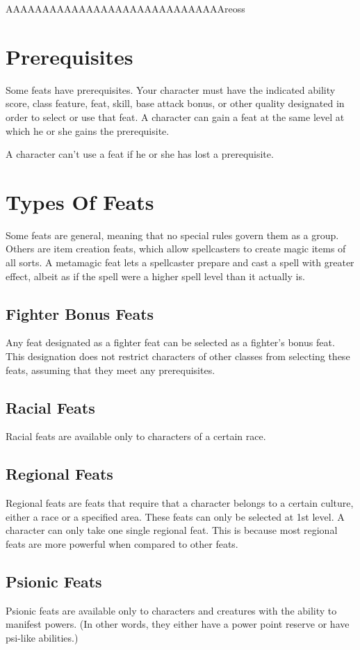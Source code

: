{AAAAAAAAAAAAAAAAAAAAAAAAAAAAAA}{reoss}
\section{Prerequisites}
Some feats have prerequisites. Your character must have the indicated ability score, class feature, feat, skill, base attack bonus, or other quality designated in order to select or use that feat. A character can gain a feat at the same level at which he or she gains the prerequisite.

A character can't use a feat if he or she has lost a prerequisite.

\section{Types Of Feats}
Some feats are general, meaning that no special rules govern them as a group. Others are item creation feats, which allow spellcasters to create magic items of all sorts. A metamagic feat lets a spellcaster prepare and cast a spell with greater effect, albeit as if the spell were a higher spell level than it actually is.

\subsection{Fighter Bonus Feats}
Any feat designated as a fighter feat can be selected as a fighter's bonus feat. This designation does not restrict characters of other classes from selecting these feats, assuming that they meet any prerequisites.

\subsection{Racial Feats}
Racial feats are available only to characters of a certain race. 

\subsection{Regional Feats}
Regional feats are feats that require that a character belongs to a certain culture, either a race or a specified area. These feats can only be selected at 1st level. A character can only take one single regional feat. This is because most regional feats are more powerful when compared to other feats.

\subsection{Psionic Feats}
Psionic feats are available only to characters and creatures with the ability to manifest powers. (In other words, they either have a power point reserve or have psi-like abilities.)

